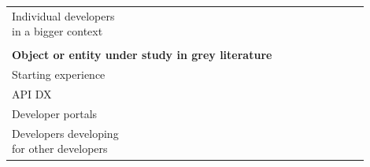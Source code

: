 \documentclass[english, 12pt, a4paper, sci, utf8, a-1b, online]{aaltothesis}
\begin{document}
{\begin{center}
\begin{longtable}{p{0.3\linewidth}p{0.6\linewidth}}
      Individual developers in a bigger context  & \textcite{entering-an-ecosystem} \newline \textcite{fagerholm2014examining}                                                                                                                                                                                                                           \\
                                                 &                                                                                                                                                                                                                                                                                                       \\
      \multicolumn{2}{l}{\textbf{Object or entity under study in grey literature}}                                                                                                                                                                                                                                                                       \\*
      Starting experience                        & \textcite{what-is-developer-experience-everydeveloper}                                                                                                                                                                                                                                                \\
      API DX                                     & \textcite{great-dx-and-the-people-who-make-them}                                                                                                                                                                                                                                                      \\
      Developer portals                          & \textcite{apis-for-humans-the-rise-of-developer-experience} \newline \textcite{4-apis-doing-developer-experience-really-well} \newline \textcite{what-is-api-developer-experience-and-why-it-matters}                                                                                                 \\
      Developers developing for other developers & \textcite{the-best-practices-for-a-great-dx} \newline \textcite{heroku-dx} \newline  \textcite{developer-experience-what-and-why} \newline \textcite{dx-devs-are-people-too} \newline \textcite{developer-experience-sanity} \newline \textcite{building-the-developer-experience-from-the-ground-up} \\

\end{longtable}
\end{center}}
\end{document}
